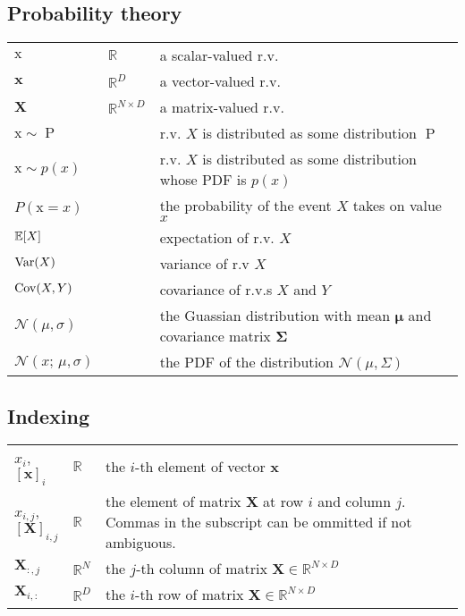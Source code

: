 \subsection*{Probability theory}
\begin{tabular}{p{0.13\linewidth}p{0.07\linewidth}p{0.80\linewidth}}
  $\mathrm x$           & $\mathbb{R}$   & a scalar-valued r.v. \\
  $\mathbf x$      & $\mathbb{R}^D$ & a vector-valued r.v. \\
  $\mathbf X$      & $\mathbb{R}^{N\times D}$ & a matrix-valued r.v. \\
  $\mathrm x \sim \operatorname{P}$    &                & r.v. $X$ is distributed as some distribution $\operatorname{P}$ \\
  $\mathrm x \sim p(x)$ &                & r.v. $X$ is distributed as some distribution whose PDF is $p(x)$ \\
  $P(\mathrm x = x)$    &                & the probability of the event $X$ takes on value $x$ \\
  $\mathbb{E}[X]$       &                & expectation of r.v. $X$ \\
  $\operatorname{Var}(X)$  &                & variance of r.v $X$ \\
  $\operatorname{Cov}(X, Y)$  &                & covariance of r.v.s $X$ and $Y$ \\
  $\mathcal{N}(\mu, \sigma)$ & & the Guassian distribution with mean $\bm\mu$ and covariance matrix $\bm\Sigma$ \\
  $\mathcal{N}(x;\, \mu, \sigma)$ & & the PDF of the distribution $\mathcal{N}(\mu, \Sigma)$ \\
\end{tabular}


\subsection*{Indexing}
\begin{tabular}{p{0.13\linewidth}p{0.07\linewidth}p{0.80\linewidth}}
  $x_i$,  $[\mathbf{x}]_i$         & $\mathbb{R}$   & the $i$-th element of vector $\mathbf{x}$ \\
  $x_{i,j}$, $[\mathbf{X}]_{i,j}$ & $\mathbb{R}$   & the element of matrix $\mathbf{X}$ at row $i$ and column $j$. Commas in the subscript can be ommitted if not ambiguous. \\
  $\mathbf{X}_{:,j}$              & $\mathbb{R}^N$ & the $j$-th column of matrix $\mathbf{X} \in \mathbb{R}^{N \times D}$  \\
  $\mathbf{X}_{i,:}$              & $\mathbb{R}^D$ & the $i$-th row of matrix $\mathbf{X} \in \mathbb{R}^{N \times D}$  \\
\end{tabular}


